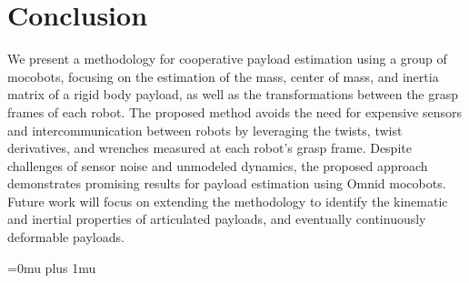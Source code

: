 \documentclass[letterpaper, 10 pt, journal, twoside]{IEEEtran}
\begin{document}
\section{Conclusion}
We present a methodology for cooperative payload estimation using a group of mocobots, focusing on the estimation of the mass, center of mass, and inertia matrix of a rigid body payload, as well as the transformations between the grasp frames of each robot. The proposed method avoids the need for expensive sensors and intercommunication between robots by leveraging the twists, twist derivatives, and wrenches measured at each robot's grasp frame. Despite challenges of sensor noise and unmodeled dynamics, the proposed approach demonstrates promising results for payload estimation using Omnid mocobots. 
Future work will focus on extending the methodology to identify the kinematic and inertial properties of articulated payloads, and eventually continuously deformable payloads.

\label{sec:conclusion} 


\balance
\small
\Urlmuskip=0mu plus 1mu\relax

\end{document}
